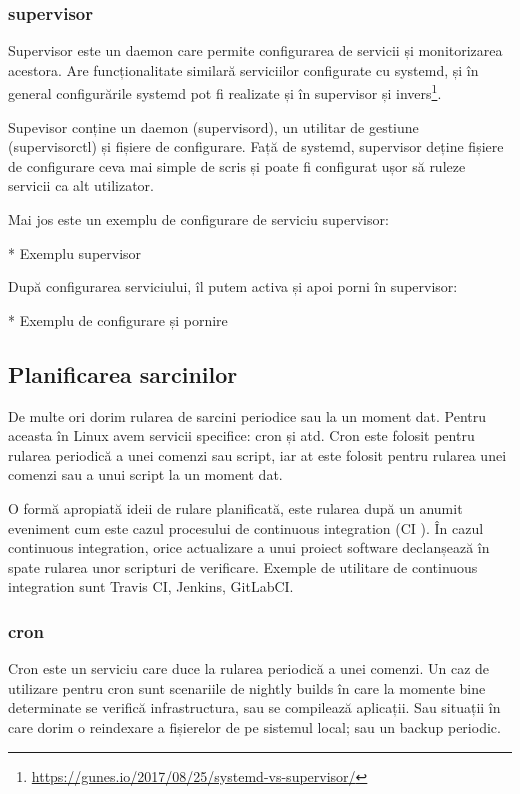 \subsubsection{supervisor}
\label{sec:auto-infosys-services-supervisor}

Supervisor este un daemon care permite configurarea de servicii și monitorizarea
acestora. Are funcționalitate similară serviciilor configurate cu systemd, și în
general configurările systemd pot fi realizate și în supervisor și
invers\footnote{\url{https://gunes.io/2017/08/25/systemd-vs-supervisor/}}.

Supevisor conține un daemon (supervisord), un utilitar de gestiune
(supervisorctl) și fișiere de configurare. Față de systemd, supervisor deține
fișiere de configurare ceva mai simple de scris și poate fi configurat ușor să
ruleze servicii ca alt utilizator.

Mai jos este un exemplu de configurare de serviciu supervisor:

* Exemplu supervisor

După configurarea serviciului, îl putem activa și apoi porni în supervisor:

* Exemplu de configurare și pornire

\subsection{Planificarea sarcinilor}
\label{sec:auto-infosys-planning}

De multe ori dorim rularea de sarcini periodice sau la un moment dat. Pentru
aceasta în Linux avem servicii specifice: cron și atd. Cron este folosit pentru
rularea periodică a unei comenzi sau script, iar at este folosit pentru rularea
unei comenzi sau a unui script la un moment dat.

O formă apropiată ideii de rulare planificată, este rularea după un anumit
eveniment cum este cazul procesului de continuous integration (CI
). În cazul continuous integration, orice
actualizare a unui proiect software declanșează în spate rularea unor scripturi
de verificare. Exemple de utilitare de continuous integration sunt Travis CI,
Jenkins, GitLabCI.

\subsubsection{cron}
\label{sec:auto-infosys-planning-cron}

Cron este un serviciu care duce la rularea periodică a unei comenzi. Un caz de
utilizare pentru cron sunt scenariile de nightly builds în care la momente bine
determinate se verifică infrastructura, sau se compilează aplicații. Sau
situații în care dorim o reindexare a fișierelor de pe sistemul local; sau un
backup periodic.

